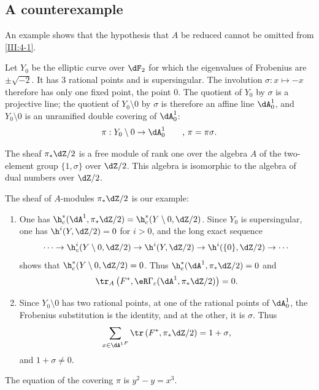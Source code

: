 \subsection{A counterexample}\label{III:4-5}

An example shows that the hypothesis that $A$ be reduced cannot be omitted
from \ref{III:4-1}.

Let $Y_0$ be the elliptic curve over $\dF_2$ for which the eigenvalues of
Frobenius are $\pm \sqrt{-2}$. It has $3$ rational points and is
supersingular. The involution $\sigma:x\mapsto -x$ therefore has only one
fixed point, the point $0$. The quotient of $Y_0$ by $\sigma$ is a projective
line; the quotient of $Y_0\setminus 0$ by $\sigma$ is therefore an affine
line $\dA_0^1$, and $Y_0\setminus 0$ is an unramified double covering of
$\dA_0^1$:
\[
  \pi:Y_0\setminus 0 \to \dA_0^1 \qquad \text{, $\pi=\pi\sigma$.}
\]

The sheaf $\pi_*\dZ/2$ is a free module of rank one over the algebra $A$ of
the two-element group $\{1,\sigma\}$ over $\dZ/2$. This algebra is isomorphic
to the algebra of dual numbers over $\dZ/2$.

The sheaf of $A$-modules $\pi_*\dZ/2$ is our example:
\begin{enumerate}[\indent a)]
  \item One has
    $\h_c^*(\dA^1,\pi_*\dZ/2) = \h_c^*(Y\setminus 0,\dZ/2)$.
    Since $Y_0$ is supersingular, one has $\h^i(Y,\dZ/2)=0$ for $i>0$, and
    the long exact sequence
    \[
      \cdots \to \h_c^i(Y\setminus 0,\dZ/2) \to \h^i(Y,\dZ/2) \to \h^i(\{0\},\dZ/2) \to \cdots
    \]
    shows that $\h_c^*(Y\setminus 0,\dZ/2)=0$. Thus
    $\h_c^*(\dA^1,\pi_*\dZ/2)=0$ and
    \[
      \tr_A\left(F^*,\eR\Gamma_c(\dA^1,\pi_*\dZ/2)\right) = 0 \text{.}
    \]
  \item Since $Y_0\setminus 0$ has two rational points, at one of the
    rational points of $\dA_0^1$, the Frobenius substitution is the identity,
    and at the other, it is $\sigma$. Thus
    \[
      \sum_{x\in {\dA^1}^F} \tr\left(F^*,\pi_*\dZ/2\right) = 1+\sigma \text{,}
    \]
    and $1+\sigma\ne 0$.
\end{enumerate}

The equation of the covering $\pi$ is $y^2-y=x^3$.
